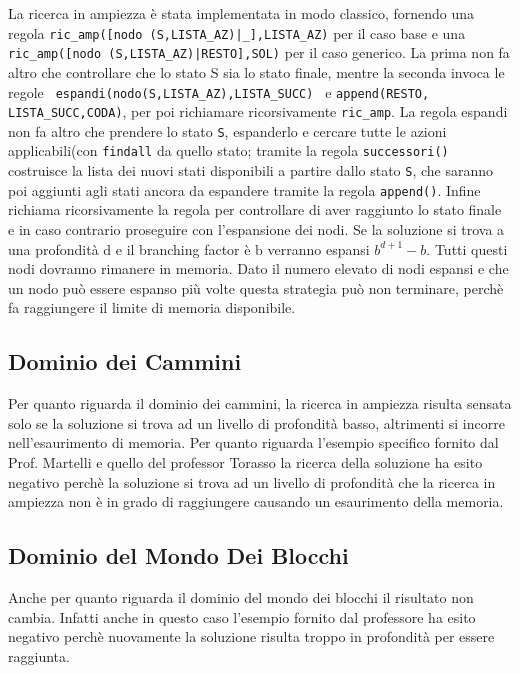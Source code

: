 La ricerca in ampiezza è stata implementata in modo classico, fornendo una regola \lstinline{ric_amp([nodo (S,LISTA_AZ)|_],LISTA_AZ)} per il caso base e una \lstinline{ric_amp([nodo (S,LISTA_AZ)|RESTO],SOL)} per il caso generico.
La prima non fa altro che controllare che lo stato S sia lo stato finale, mentre la seconda invoca le regole \lstinline{ espandi(nodo(S,LISTA_AZ),LISTA_SUCC) } e \lstinline{append(RESTO, LISTA_SUCC,CODA)}, per poi richiamare ricorsivamente \lstinline{ric_amp}.
La regola espandi non fa altro che prendere lo stato \lstinline{S}, espanderlo e cercare tutte le azioni applicabili(con \lstinline{findall} da quello stato; tramite la regola \lstinline{successori()} costruisce la lista dei nuovi stati disponibili a partire dallo stato \lstinline{S}, che saranno poi aggiunti agli stati ancora da espandere tramite la regola \lstinline{append()}.
Infine richiama ricorsivamente la regola per controllare di aver raggiunto lo stato finale e in caso contrario proseguire con l'espansione dei nodi. 
Se la soluzione si trova a una profondità d e il branching factor è b verranno espansi \begin{math} b^{d+1}-b \end{math}. Tutti questi nodi dovranno rimanere in memoria. Dato il numero elevato di nodi espansi e che un nodo può essere espanso più volte questa strategia può non terminare, perchè fa raggiungere il limite di memoria disponibile.

\subsection{Dominio dei Cammini}
Per quanto riguarda il dominio dei cammini, la ricerca in ampiezza risulta sensata solo se la soluzione si trova ad un livello di profondità basso, altrimenti si incorre nell'esaurimento di memoria. Per quanto riguarda l'esempio specifico fornito dal Prof. Martelli e quello del professor Torasso la ricerca della soluzione ha esito negativo perchè la soluzione si trova ad un livello di profondità che la ricerca in ampiezza non è in grado di raggiungere causando un esaurimento della memoria.

\subsection{Dominio del Mondo Dei Blocchi}
Anche per quanto riguarda il dominio del mondo dei blocchi il risultato non cambia. Infatti anche in questo caso l'esempio fornito dal professore ha esito negativo perchè nuovamente la soluzione risulta troppo in profondità per essere raggiunta.
\newpage
